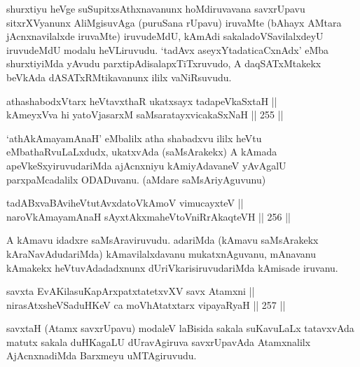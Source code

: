 \begin{artha}
shurxtiyu heVge suSupitxsAthxnavanunx hoMdiruvavana savxrUpavu
sitxrXVyanunx AliMgisuvAga (puruSana rUpavu) iruvaMte (bAhayx AMtara
jAcnxnavilalxde iruvaMte) iruvudeMdU, kAmAdi sakaladoVSavilalxdeyU
iruvudeMdU modalu heVLiruvudu. `tadAvx aseyxYtadaticaCxnAdx' eMba shurxtiyiMda yAvudu
parxtipAdisalapxTiTxruvudo, A daqSATxMtakekx beVkAda dASATxRMtikavanunx ililx vaNiRsuvudu.
\end{artha}

\begin{shl}
athashabodxV\s tarx heVtavxthaR ukatxsayx tadapeVkaSxtaH || \\
kAmeyxVva hi yatoV\s jasarxM saMsaratayxvicakaSxNaH \hfill || 255 ||  
\end{shl}

\begin{artha}
`athAkAmayamAnaH' eMbalilx atha shabadxvu ililx heVtu eMbathaRvuLaLxdudx,
ukatxvAda (saMsArakekx) A kAmada apeVkeSxyiruvudariMda ajAcnxniyu
kAmiyAdavaneV yAvAgalU parxpaMcadalilx ODADuvanu. (aMdare saMsAriyAguvunu)
\end{artha}

\begin{shl}
tadABxvaBAviheVtutAvxdatoV\s kAmoV vimucayxteV ||  \\
naroV\s kAmayamAnaH sAyxtAkxmaheVtoVniRrAkaqteVH \hfill || 256 ||  
\end{shl}

\begin{artha}
A kAmavu idadxre saMsAraviruvudu. adariMda (kAmavu saMsArakekx
kAraNavAdudariMda) kAmavilalxdavanu mukatxnAguvanu, mAnavanu kAmakekx
heVtuvAdadadxnunx dUriVkarisiruvudariMda kAmisade iruvanu.
\end{artha}


\begin{shl}
savxta EvAKilasuKapArxpatxtatetxvXV savx Atamxni || \\
nirasAtxsheVSaduHKeV ca moVhAtatxtarx vipayaRyaH \hfill || 257 ||  
\end{shl}

\begin{artha}
savxtaH (Atamx savxrUpavu) modaleV laBisida sakala suKavuLaLx
tatavxvAda matutx sakala duHKagaLU dUravAgiruva savxrUpavAda
Atamxnalilx AjAcnxnadiMda Barxmeyu uMTAgiruvudu.
\end{artha}


